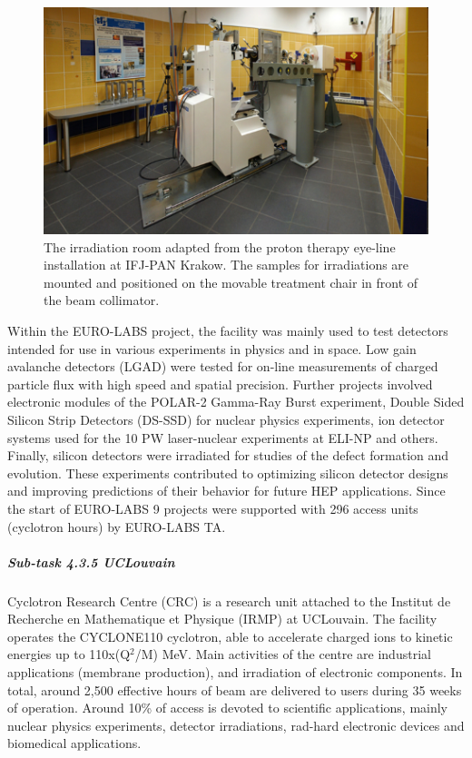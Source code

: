\begin{figure}[!h]
    \centering
    \includegraphics[width=0.75\linewidth]{image10.png}
    \caption{The irradiation room adapted from the proton therapy eye-line installation at IFJ-PAN Krakow. The samples for irradiations are mounted and positioned on the movable treatment chair in front of the beam collimator.}
    \label{fig:4.3.4}
\end{figure}

Within the EURO-LABS project, the facility was mainly used to test detectors intended for use in various experiments in physics and in space. Low gain avalanche detectors (LGAD) were tested for on-line measurements of charged particle flux with high speed and spatial precision. Further projects involved electronic modules of the POLAR-2 Gamma-Ray Burst experiment, Double Sided Silicon Strip Detectors (DS-SSD) for nuclear physics experiments, ion detector systems used for the 10 PW laser-nuclear experiments at ELI-NP and others.  Finally, silicon detectors were irradiated for studies of the defect formation and evolution. These experiments contributed to optimizing silicon detector designs and improving predictions of their behavior for future HEP applications.  Since the start of EURO-LABS 9 projects were supported with 296 access units (cyclotron hours) by EURO-LABS TA.

\subparagraph{Sub-task 4.3.5 UCLouvain} \mbox{}

Cyclotron Research Centre (CRC) is a research unit attached to the Institut de Recherche en Mathematique et Physique (IRMP) at UCLouvain. The facility operates the CYCLONE110 cyclotron, able to accelerate charged ions to kinetic energies up to 110x(Q$^2$/M) MeV. Main activities of the centre are industrial applications (membrane production), and irradiation of electronic components. In total, around 2,500 effective hours of beam are delivered to users during 35 weeks of operation. Around 10\% of access is devoted to scientific applications, mainly nuclear physics experiments, detector irradiations, rad-hard electronic devices and biomedical applications.

